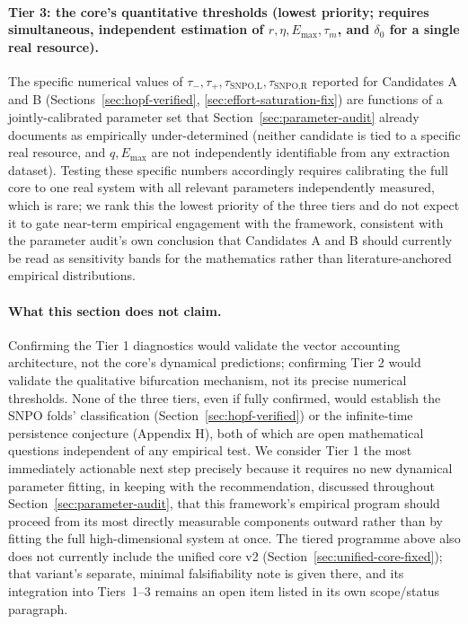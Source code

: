 \documentclass[twocolumn,10pt]{article}
\begin{document}
\paragraph{Tier 3: the core's quantitative thresholds (lowest priority; requires simultaneous, independent estimation of $r,\eta,E_{\max},\tau_m$, and $\delta_0$ for a single real resource).} The specific numerical values of $\tau_-,\tau_+,\tau_{\text{SNPO,L}},\tau_{\text{SNPO,R}}$ reported for Candidates A and B (Sections~\ref{sec:hopf-verified}, \ref{sec:effort-saturation-fix}) are functions of a jointly-calibrated parameter set that Section~\ref{sec:parameter-audit} already documents as empirically under-determined (neither candidate is tied to a specific real resource, and $q,E_{\max}$ are not independently identifiable from any extraction dataset). Testing these specific numbers accordingly requires calibrating the full core to one real system with all relevant parameters independently measured, which is rare; we rank this the lowest priority of the three tiers and do not expect it to gate near-term empirical engagement with the framework, consistent with the parameter audit's own conclusion that Candidates A and B should currently be read as sensitivity bands for the mathematics rather than literature-anchored empirical distributions.

\paragraph{What this section does not claim.} Confirming the Tier 1 diagnostics would validate the vector accounting architecture, not the core's dynamical predictions; confirming Tier 2 would validate the qualitative bifurcation mechanism, not its precise numerical thresholds. None of the three tiers, even if fully confirmed, would establish the SNPO folds' classification (Section~\ref{sec:hopf-verified}) or the infinite-time persistence conjecture (Appendix H), both of which are open mathematical questions independent of any empirical test. We consider Tier 1 the most immediately actionable next step precisely because it requires no new dynamical parameter fitting, in keeping with the recommendation, discussed throughout Section~\ref{sec:parameter-audit}, that this framework's empirical program should proceed from its most directly measurable components outward rather than by fitting the full high-dimensional system at once. The tiered programme above also does not currently include the unified core v2 (Section~\ref{sec:unified-core-fixed}); that variant's separate, minimal falsifiability note is given there, and its integration into Tiers~1--3 remains an open item listed in its own scope/status paragraph.
\end{document}
